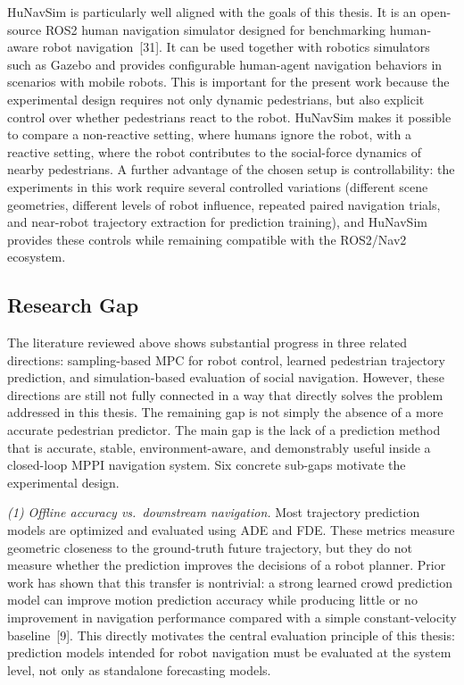 \documentclass[12pt, a4paper]{article}
\begin{document}
HuNavSim is particularly well aligned with the goals of this thesis. It is an open-source ROS2 human navigation simulator designed for benchmarking human-aware robot navigation~[31]. It can be used together with robotics simulators such as Gazebo and provides configurable human-agent navigation behaviors in scenarios with mobile robots. This is important for the present work because the experimental design requires not only dynamic pedestrians, but also explicit control over whether pedestrians react to the robot. HuNavSim makes it possible to compare a non-reactive setting, where humans ignore the robot, with a reactive setting, where the robot contributes to the social-force dynamics of nearby pedestrians. A further advantage of the chosen setup is controllability: the experiments in this work require several controlled variations (different scene geometries, different levels of robot influence, repeated paired navigation trials, and near-robot trajectory extraction for prediction training), and HuNavSim provides these controls while remaining compatible with the ROS2/Nav2 ecosystem.

\subsection{Research Gap}

The literature reviewed above shows substantial progress in three related directions: sampling-based MPC for robot control, learned pedestrian trajectory prediction, and simulation-based evaluation of social navigation. However, these directions are still not fully connected in a way that directly solves the problem addressed in this thesis. The remaining gap is not simply the absence of a more accurate pedestrian predictor. The main gap is the lack of a prediction method that is accurate, stable, environment-aware, and demonstrably useful inside a closed-loop MPPI navigation system. Six concrete sub-gaps motivate the experimental design.

\emph{(1) Offline accuracy vs.\ downstream navigation.} Most trajectory prediction models are optimized and evaluated using ADE and FDE. These metrics measure geometric closeness to the ground-truth future trajectory, but they do not measure whether the prediction improves the decisions of a robot planner. Prior work has shown that this transfer is nontrivial: a strong learned crowd prediction model can improve motion prediction accuracy while producing little or no improvement in navigation performance compared with a simple constant-velocity baseline~[9]. This directly motivates the central evaluation principle of this thesis: prediction models intended for robot navigation must be evaluated at the system level, not only as standalone forecasting models.
\end{document}

